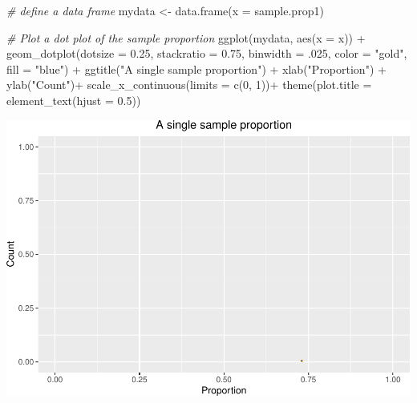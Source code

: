 \documentclass[
]{book}
\newenvironment{Shaded}{\begin{snugshade}}{\end{snugshade}}
\newcommand{\AttributeTok}[1]{\textcolor[rgb]{0.77,0.63,0.00}{#1}}
\newcommand{\CommentTok}[1]{\textcolor[rgb]{0.56,0.35,0.01}{\textit{#1}}}
\newcommand{\DecValTok}[1]{\textcolor[rgb]{0.00,0.00,0.81}{#1}}
\newcommand{\FloatTok}[1]{\textcolor[rgb]{0.00,0.00,0.81}{#1}}
\newcommand{\FunctionTok}[1]{\textcolor[rgb]{0.00,0.00,0.00}{#1}}
\newcommand{\NormalTok}[1]{#1}
\newcommand{\OtherTok}[1]{\textcolor[rgb]{0.56,0.35,0.01}{#1}}
\newcommand{\SpecialCharTok}[1]{\textcolor[rgb]{0.00,0.00,0.00}{#1}}
\newcommand{\StringTok}[1]{\textcolor[rgb]{0.31,0.60,0.02}{#1}}
\begin{document}
\begin{Shaded}
\begin{Highlighting}[]
\CommentTok{\# define a data frame}
\NormalTok{mydata }\OtherTok{\textless{}{-}} \FunctionTok{data.frame}\NormalTok{(}\AttributeTok{x =}\NormalTok{ sample.prop1)}

\CommentTok{\# Plot a dot plot of the sample proportion}
\FunctionTok{ggplot}\NormalTok{(mydata, }\FunctionTok{aes}\NormalTok{(}\AttributeTok{x =}\NormalTok{ x)) }\SpecialCharTok{+}
   \FunctionTok{geom\_dotplot}\NormalTok{(}\AttributeTok{dotsize =} \FloatTok{0.25}\NormalTok{,}
               \AttributeTok{stackratio =} \FloatTok{0.75}\NormalTok{,}
               \AttributeTok{binwidth =}\NormalTok{ .}\DecValTok{025}\NormalTok{,}
               \AttributeTok{color =} \StringTok{"gold"}\NormalTok{,}
               \AttributeTok{fill =} \StringTok{"blue"}\NormalTok{) }\SpecialCharTok{+}
  \FunctionTok{ggtitle}\NormalTok{(}\StringTok{"A single sample proportion"}\NormalTok{) }\SpecialCharTok{+}  \FunctionTok{xlab}\NormalTok{(}\StringTok{"Proportion"}\NormalTok{) }\SpecialCharTok{+} \FunctionTok{ylab}\NormalTok{(}\StringTok{"Count"}\NormalTok{)}\SpecialCharTok{+}
  \FunctionTok{scale\_x\_continuous}\NormalTok{(}\AttributeTok{limits =} \FunctionTok{c}\NormalTok{(}\DecValTok{0}\NormalTok{, }\DecValTok{1}\NormalTok{))}\SpecialCharTok{+} 
  \FunctionTok{theme}\NormalTok{(}\AttributeTok{plot.title =} \FunctionTok{element\_text}\NormalTok{(}\AttributeTok{hjust =} \FloatTok{0.5}\NormalTok{))}
\end{Highlighting}
\end{Shaded}

\includegraphics[width=1\linewidth]{Class_Activity_7_files/figure-latex/unnamed-chunk-10-1}
\end{document}
